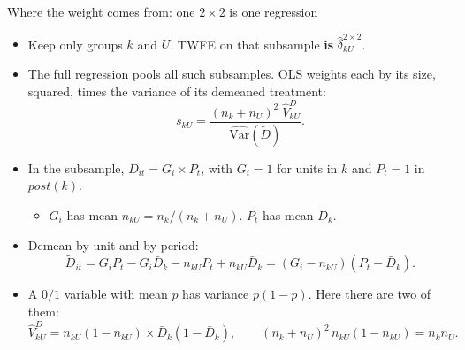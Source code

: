 \documentclass[
  11pt,
  ignorenonframetext,
  aspectratio=169,
]{beamer}
\providecommand{\tightlist}{%
  \setlength{\itemsep}{0pt}\setlength{\parskip}{0pt}}
\begin{document}
\begin{frame}{Where the weight comes from: one \(2 \times 2\) is one
regression}
\protect{}\label{where-the-weight-comes-from-one-2-times-2-is-one-regression}
\begin{itemize}
\tightlist
\item
  Keep only groups \(k\) and \(U\). TWFE on that subsample \textbf{is}
  \(\hat\delta^{2\times2}_{kU}\).
\item
  The full regression pools all such subsamples. OLS weights each by its
  size, squared, times the variance of its demeaned treatment: \[
  s_{kU} = \frac{(n_k + n_U)^2\; \hat V^D_{kU}}{\widehat{\text{Var}}(\tilde D)} .
  \]
\item
  In the subsample, \(D_{it} = G_i \times P_t\), with \(G_i = 1\) for
  units in \(k\) and \(P_t = 1\) in \(post(k)\).

  \begin{itemize}
  \tightlist
  \item
    \(G_i\) has mean \(n_{kU} = n_k/(n_k + n_U)\). \(P_t\) has mean
    \(\bar D_k\).
  \end{itemize}
\item
  Demean by unit and by period: \[
  \tilde D_{it} = G_iP_t - G_i\bar D_k - n_{kU}P_t + n_{kU}\bar D_k = (G_i - n_{kU})(P_t - \bar D_k).
  \]
\item
  A \(0/1\) variable with mean \(p\) has variance \(p(1-p)\). Here there
  are two of them: \[
  \hat V^D_{kU} = n_{kU}(1 - n_{kU}) \times \bar D_k(1 - \bar D_k), \qquad (n_k + n_U)^2\, n_{kU}(1 - n_{kU}) = n_k n_U .
  \]
\end{itemize}
\end{frame}
\end{document}
